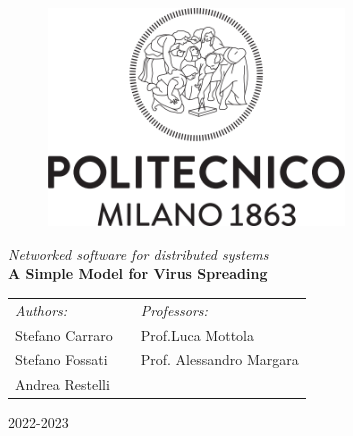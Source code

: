 \begin{titlepage}

\begin{center}
		\begin{figure}[ht]
			\centering\includegraphics[width=0.7\textwidth]{resources/Logo_Politecnico_Milano.png}
		\end{figure}
        
        \vspace{3.5cm}

        \LARGE
        \textit{Networked software for distributed systems}\\

        \vspace{0.5cm}
        \Large
        \textbf{A Simple Model for Virus Spreading}
        
        \vspace{\fill}
  
		\large
		\begin{tabularx}{\linewidth}{@{}lXl@{}}
			\textit{Authors:}  & & \textit{Professors:} \\
			Stefano Carraro      & & Prof.\@ Luca Mottola\\
			Stefano Fossati  & & Prof. Alessandro Margara \\
			Andrea Restelli & & \\
		\end{tabularx}		
		\thispagestyle{empty}

        \vspace{1cm}

        2022-2023
           
\end{center}
\end{titlepage}